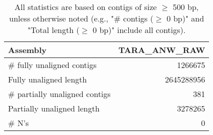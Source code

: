 \documentclass[12pt,a4paper]{article}
\begin{document}
\begin{table}[ht]
\begin{center}
\caption{All statistics are based on contigs of size $\geq$ 500 bp, unless otherwise noted (e.g., "\# contigs ($\geq$ 0 bp)" and "Total length ($\geq$ 0 bp)" include all contigs).}
\begin{tabular}{|l*{1}{|r}|}
\hline
Assembly & TARA\_ANW\_RAW \\ \hline
\# fully unaligned contigs & 1266675 \\ \hline
Fully unaligned length & 2645288956 \\ \hline
\# partially unaligned contigs & 381 \\ \hline
Partially unaligned length & 3278265 \\ \hline
\# N's & 0 \\ \hline
\end{tabular}
\end{center}
\end{table}
\end{document}
